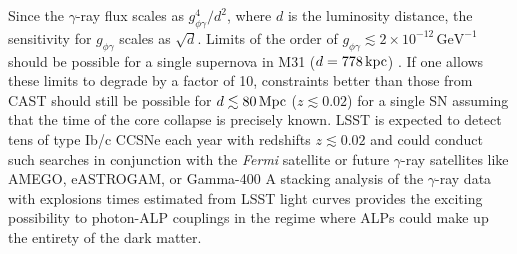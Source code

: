 Since the $\gamma$-ray flux scales as $g_{\phi\gamma}^4 / d^2$, where $d$ is the luminosity distance, the sensitivity for $g_{\phi\gamma}$ scales as $\sqrt{d}$. 
Limits of the order of $g_{\phi\gamma} \lesssim 2\times10^{-12}\,\mathrm{GeV}^{-1}$ should be possible for a single supernova in M31 ($d=778\mathrm{\,kpc}$) \citep{2017PhRvL.118a1103M}. 
If one allows these limits to degrade by a factor of 10, constraints better than those from CAST should still be possible for $d\lesssim 80\mathrm{\,Mpc}$ ($z \lesssim 0.02$) for a single SN assuming that the time of the core collapse is precisely known. 
LSST is expected to detect tens of type Ib/c CCSNe each year with redshifts $z \lesssim 0.02$ \citep{Goldstein:2018} and could conduct such searches in conjunction with the \textit{Fermi} satellite or future $\gamma$-ray satellites like AMEGO, eASTROGAM, or Gamma-400 \citep[\eg,][]{2017ICRC...35..910C,1502.02976} 
A stacking analysis of the $\gamma$-ray data with explosions times estimated from LSST light curves provides the exciting possibility to photon-ALP couplings in the regime where ALPs could make up the entirety of the dark matter. 
